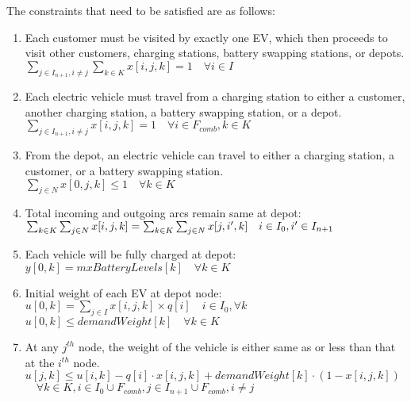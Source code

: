 \documentclass[conference]{IEEEtran}
\begin{document}
\noindent The constraints that need to be satisfied are as follows:

\begin{enumerate}
    \item Each customer must be visited by exactly one EV, which then proceeds to visit other customers, charging stations, battery swapping stations, or depots.\\
    $\sum_{j \in I_{n+1}, i \neq j} \sum_{k \in K} x[i, j, k] =1  \quad \forall i \in I$
    \item Each electric vehicle must travel from a charging station to either a customer, another charging station, a battery swapping station, or a depot.\\
    $\sum_{j \in I_{n+1}, i \neq j}  x[i, j, k] = 1 \quad \forall i \in F_{comb}, k \in K$ \\
    \item From the depot, an electric vehicle can travel to either a charging station, a customer, or a battery swapping station. \\
    $\sum_{j \in N} x[0, j, k] \leq 1 \quad \forall k \in K$

    \item Total incoming and outgoing arcs remain same at depot: \\
    $\sum_{k \in K} \sum_{j \in N } x[i, j, k] =  \sum_{k \in K}\sum_{ j \in N}  x[j, i', k] \\\quad  i \in I_{0}, i^{\prime} \in I_{n+1} $
     
    \item Each vehicle will be fully charged at depot: \\
    $y[0, k] = mxBatteryLevels[k] \quad \forall k \in K$ \\ 
    
    
    \item Initial weight of each EV at depot node: \\
     $ u[0, k]= \sum_{j \in I} x[i, j, k] \times q[i] \quad i \in I_0, \forall k$ \\
     $ u[0, k] \leq demandWeight[k] \quad \forall  k \in K$ \\ 
    \item At any $j^{th}$ node, the weight of the vehicle is either same as or less than that at the $i^{th}$ node. \\
    $u[j, k] \leq u[i, k] - q[i] \cdot x[i, j, k] + demandWeight[k] \cdot (1 - x[i, j, k])$ $ \quad \forall k \in K, i \in I_{0} \cup F_{comb}, j \in I_{n+1} \cup F_{comb}, i \neq j$ \\
    

\end{enumerate}
\end{document}
